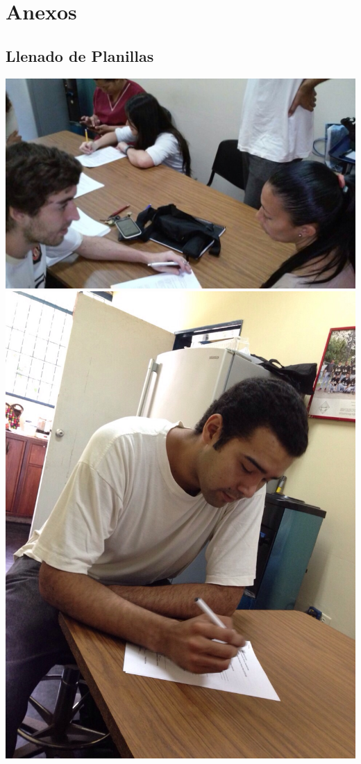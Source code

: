 \chapter*{Anexos}

\section*{Llenado de Planillas}
\includegraphics[scale=0.3]{./Anexos/img/p1.jpg}\\

\includegraphics[scale=0.2]{./Anexos/img/p2.jpg}\\

